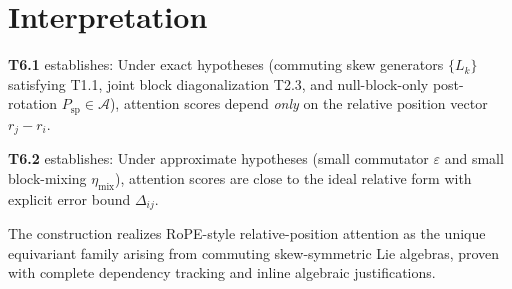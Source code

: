 \documentclass[11pt]{article}
\begin{document}
\section*{Interpretation}

\textbf{T6.1} establishes: Under exact hypotheses (commuting skew generators $\{L_k\}$ satisfying T1.1, joint block diagonalization T2.3, and null-block-only post-rotation $P_{\mathrm{sp}}\in\mathcal{A}$), attention scores depend \emph{only} on the relative position vector $r_j - r_i$.

\textbf{T6.2} establishes: Under approximate hypotheses (small commutator $\varepsilon$ and small block-mixing $\eta_{\mathrm{mix}}$), attention scores are close to the ideal relative form with explicit error bound $\Delta_{ij}$.

The construction realizes RoPE-style relative-position attention as the unique equivariant family arising from commuting skew-symmetric Lie algebras, proven with complete dependency tracking and inline algebraic justifications.
\end{document}
